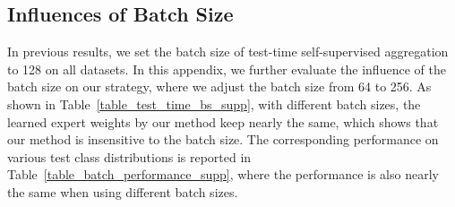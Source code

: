 \documentclass{article}
\begin{document}
\clearpage
\subsection{Influences of Batch Size}
In previous results, we set the batch size of   test-time self-supervised aggregation   to 128   on all datasets. In this appendix, we further evaluate the influence of the  batch size on our strategy, where we adjust the batch size from 64 to 256. As shown in Table~\ref{table_test_time_bs_supp}, with different batch sizes, the learned expert weights by our method  keep nearly the same, which shows that our method is insensitive to the batch size. The corresponding performance on various test class distributions is reported in Table~\ref{table_batch_performance_supp}, where the performance is also nearly the same when using different batch sizes.
\end{document}
